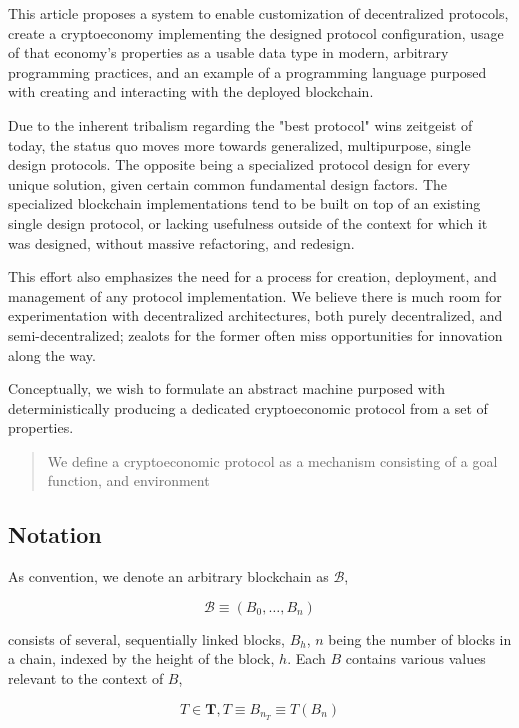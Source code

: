 \documentclass[12pt, titlepage, twocolumn]{report}
\begin{document}
This article proposes a system to enable customization of decentralized protocols, create a cryptoeconomy implementing the designed protocol configuration, usage of that economy's properties as a usable data type in modern, arbitrary programming practices, and an example of a programming language purposed with creating and interacting with the deployed blockchain.

Due to the inherent tribalism regarding the "best protocol" wins zeitgeist of today, the status quo moves more towards generalized, multipurpose, single design protocols. The opposite being a specialized protocol design for every unique solution, given certain common fundamental design factors. The specialized blockchain implementations tend to be built on top of an existing single design protocol, or lacking usefulness outside of the context for which it was designed, without massive refactoring, and redesign.

This effort also emphasizes the need for a process for creation, deployment, and management of any protocol implementation. We believe there is much room for experimentation with decentralized architectures, both purely decentralized, and semi-decentralized; zealots for the former often miss opportunities for innovation along the way.

Conceptually, we wish to formulate an abstract machine purposed with deterministically producing a dedicated cryptoeconomic protocol from a set of properties.

\begin{quotation}
  We define a cryptoeconomic protocol as a mechanism consisting of a goal function, and environment
 \end{quotation} 


\subsection{Notation}
As convention, we denote an arbitrary blockchain as \(\boldsymbol{\mathcal{B}}\), 

\begin{equation}
	\boldsymbol{\mathcal{B}} \equiv (B_0, \ldots, B_n   )
\end{equation}

consists of several, sequentially linked blocks, \(B_h\), \(n\) being the number of blocks in a chain, indexed by the height of the block, \(h\). Each \(B\) contains various values relevant to the context of \(B\),

\begin{equation}
T \in \boldsymbol{T}, T \equiv B_{n_{T}} \equiv T(B_n)
\end{equation}
\end{document}
